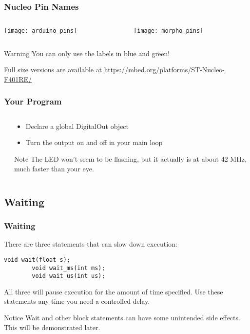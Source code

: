 \begin{frame}
	\frametitle{Nucleo Pin Names}
	\begin{columns}[c]
		\begin{column}{0.5\textwidth}
			\texttt{[image: arduino\_pins]}
		\end{column}
		\begin{column}{0.5\textwidth}
			\texttt{[image: morpho\_pins]}
		\end{column}
	\end{columns}
	\begin{block}{Warning}
		You can only use the labels in blue and green!
	\end{block}
	\begin{center}
		\small Full size versions are available at \url{https://mbed.org/platforms/ST-Nucleo-F401RE/}
	\end{center}
\end{frame}

\begin{frame}
	\frametitle{Your Program}
	\begin{columns}[c]
		\begin{column}{0.55\textwidth}
			
		\end{column}
		\begin{column}{0.45\textwidth}
			\begin{itemize}
				\item Declare a global DigitalOut object
				\item Turn the output on and off in your main loop
			\end{itemize}
			\begin{block}{Note}
				The LED won't seem to be flashing, but it actually is at about 42 MHz, much faster than your eye.
			\end{block}
		\end{column}
	\end{columns}
\end{frame}

\subsection{Waiting}
\label{sub:waiting}
\begin{frame}[fragile]
	\frametitle{Waiting}
	There are three statements that can slow down execution:
	\begin{lstlisting}[numbers=none]
		void wait(float s);
		void wait_ms(int ms);
		void wait_us(int us);
	\end{lstlisting}
	All three will pause execution for the amount of time specified. Use these statements any time you need a controlled delay.
	\begin{block}{Notice}
		Wait and other block statements can have some unintended side effects. This will be demonstrated later.
	\end{block}
\end{frame}

